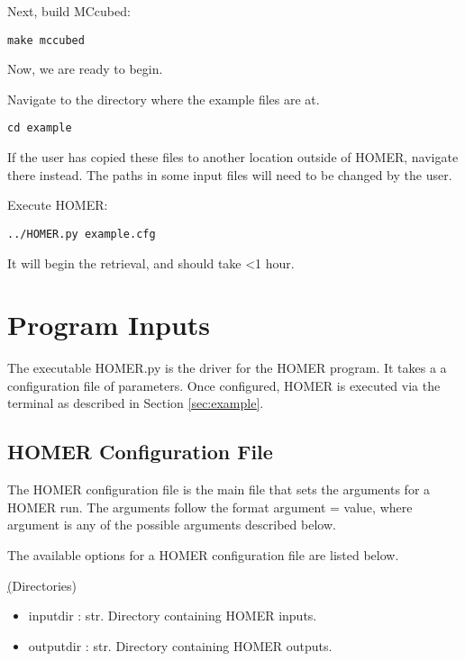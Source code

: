 \documentclass[letterpaper, 12pt]{article}
\begin{document}
\noindent Next, build MCcubed:
\begin{verbatim}
make mccubed
\end{verbatim}

\noindent Now, we are ready to begin.\newline

\noindent Navigate to the directory where the example files are at.
\begin{verbatim}
cd example
\end{verbatim}
If the user has copied these files to another location outside of HOMER, 
navigate there instead.  The paths in some input files will need to be changed 
by the user. \newline

\noindent Execute HOMER:
\begin{verbatim}
../HOMER.py example.cfg
\end{verbatim}

\noindent It will begin the retrieval, and should take \textless 1 hour.



\section{Program Inputs}
\label{sec:inputs}

The executable HOMER.py is the driver for the HOMER program. It takes a 
a configuration file of parameters.  Once configured, HOMER is executed via 
the terminal as described in Section \ref{sec:example}.


\subsection{HOMER Configuration File}
\label{sec:config}
The HOMER configuration file is the main file that sets the arguments for a 
HOMER run. The arguments follow the format {\ttb argument = value}, where 
{\ttb argument} is any of the possible arguments described below. 

\noindent The available options for a HOMER configuration file are listed below.

\noindent \underline(Directories)
\begin{itemize}
\item inputdir   : str.  Directory containing HOMER inputs.
\item outputdir  : str.  Directory containing HOMER outputs.
\end{itemize}
\end{document}
